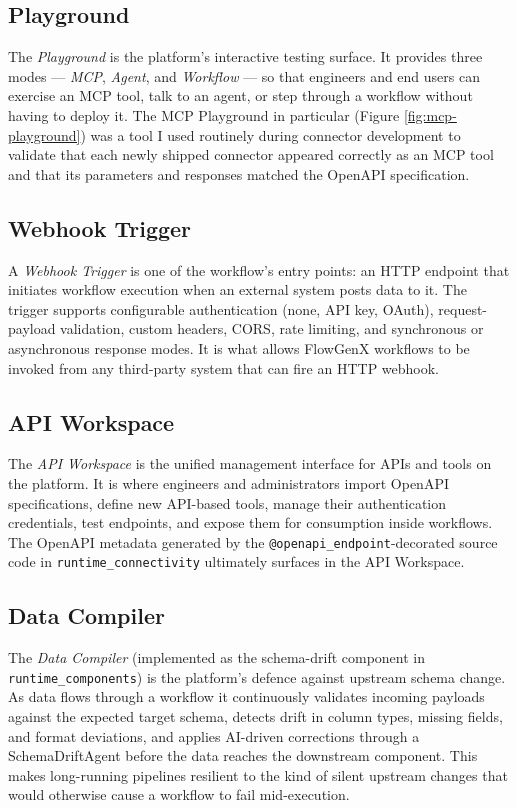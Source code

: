 \subsection{Playground}
The \emph{Playground} is the platform's interactive testing surface.
It provides three modes --- \emph{MCP}, \emph{Agent}, and
\emph{Workflow} --- so that engineers and end users can exercise an
MCP tool, talk to an agent, or step through a workflow without
having to deploy it. The MCP Playground in particular (Figure
\ref{fig:mcp-playground}) was a tool I used routinely during
connector development to validate that each newly shipped connector
appeared correctly as an MCP tool and that its parameters and
responses matched the OpenAPI specification.

\subsection{Webhook Trigger}
A \emph{Webhook Trigger} is one of the workflow's entry points: an
HTTP endpoint that initiates workflow execution when an external
system posts data to it. The trigger supports configurable
authentication (none, API key, OAuth), request-payload validation,
custom headers, CORS, rate limiting, and synchronous or asynchronous
response modes. It is what allows FlowGenX workflows to be invoked
from any third-party system that can fire an HTTP webhook.

\subsection{API Workspace}
The \emph{API Workspace} is the unified management interface for
APIs and tools on the platform. It is where engineers and
administrators import OpenAPI specifications, define new API-based
tools, manage their authentication credentials, test endpoints, and
expose them for consumption inside workflows. The OpenAPI metadata
generated by the \texttt{@openapi\_endpoint}-decorated source code in
\texttt{runtime\_connectivity} ultimately surfaces in the API
Workspace.

\subsection{Data Compiler}
The \emph{Data Compiler} (implemented as the schema-drift component
in \texttt{runtime\_components}) is the platform's defence against
upstream schema change. As data flows through a workflow it
continuously validates incoming payloads against the expected target
schema, detects drift in column types, missing fields, and format
deviations, and applies AI-driven corrections through a
SchemaDriftAgent before the data reaches the downstream component.
This makes long-running pipelines resilient to the kind of silent
upstream changes that would otherwise cause a workflow to fail
mid-execution.

